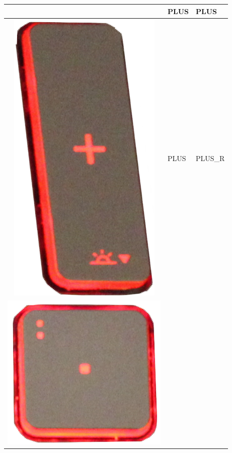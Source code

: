 \begin{longtable}{|cll|}
\begin{minipage}[c]{.3\textwidth}
\vspace{0.2cm}
\end{minipage} & PLUS & PLUS\\
\hline
\begin{minipage}[c]{.3\textwidth}
\vspace{0.2cm}
\includegraphics[scale=0.06]{Images/KeyMapping/PLUS_R}
\vspace{0.2cm}
\end{minipage} & PLUS & PLUS\_R\\
\hline
\begin{minipage}[c]{.3\textwidth}
\vspace{0.2cm}
\includegraphics[scale=0.06]{Images/KeyMapping/POINT}

\end{minipage}
\end{longtable}
